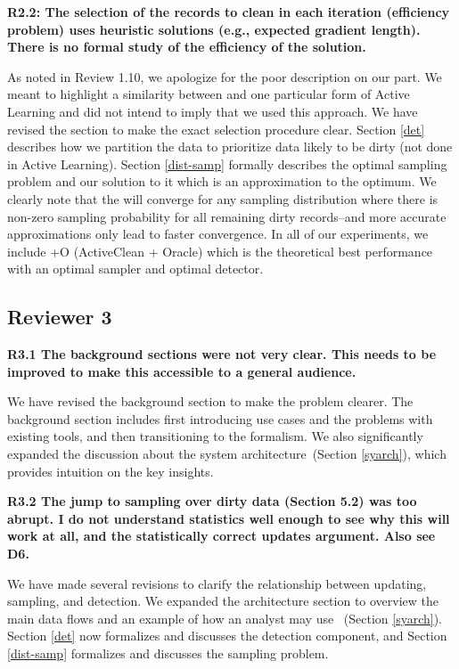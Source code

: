 \vspace{0.5em}

\noindent\textbf{R2.2: The selection of the records to clean in each iteration (efficiency problem) uses heuristic solutions (e.g., expected gradient length). There is no formal study of the efficiency of the solution.}

\noindent  As noted in Review 1.10, we apologize for the poor description on our part. We meant to highlight a similarity between \sys and one particular form of Active Learning and did not intend to imply that we used this approach. 
We have revised the section to make the exact selection procedure clear. Section \ref{det} describes how we partition the data to prioritize data likely to be dirty (not done in Active Learning). Section \ref{dist-samp} formally describes the optimal sampling problem and our solution to it which is an approximation to the optimum. We clearly note that the \sys will converge for any sampling distribution where there is non-zero sampling probability for all remaining dirty records--and more accurate approximations only lead to faster convergence. In all of our experiments, we include \sys+O (ActiveClean + Oracle) which is the theoretical best performance with an optimal sampler and optimal detector.

 \subsection*{Reviewer 3}

\noindent\textbf{R3.1 The background sections were not very clear. This needs to be improved
to make this accessible to a general audience.}

\noindent  We have revised the background section to make the problem clearer. The background section includes first introducing use cases and the problems with existing tools, and then transitioning to the formalism. We also significantly expanded the discussion about the system architecture~(Section \ref{syarch}), which provides intuition on the key insights.

\vspace{0.5em}

\noindent\textbf{R3.2 The jump to sampling over dirty data (Section 5.2) was too abrupt.
I do not understand statistics well enough to see why this will work at all,
and the statistically correct updates argument. Also see D6.}

\noindent  We have made several revisions to clarify the relationship between updating, sampling, and detection. We expanded the architecture section to overview the main data flows and an example of how an analyst may use \sys~(Section \ref{syarch}). Section \ref{det} now formalizes and discusses the detection component, and Section \ref{dist-samp} formalizes and discusses the sampling problem.

